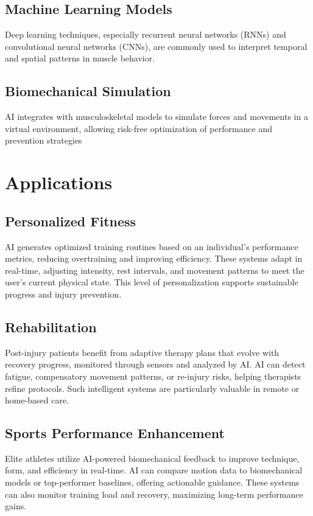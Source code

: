 \documentclass[a4paper,10pt,twocolumn]{memoir}
\begin{document}
\subsection{Machine Learning Models}
Deep learning techniques, especially recurrent neural networks (RNNs) and convolutional neural networks (CNNs), are commonly used to interpret temporal and spatial patterns in muscle behavior.

\subsection{Biomechanical Simulation}
AI integrates with musculoskeletal models to simulate forces and movements in a virtual environment, allowing risk-free optimization of performance and prevention strategies 


\section*{Applications}

\subsection{Personalized Fitness}
AI generates optimized training routines based on an individual's performance metrics, reducing overtraining and improving efficiency. These systems adapt in real-time, adjusting intensity, rest intervals, and movement patterns to meet the user's current physical state. This level of personalization supports sustainable progress and injury prevention.

\subsection{Rehabilitation}
Post-injury patients benefit from adaptive therapy plans that evolve with recovery progress, monitored through sensors and analyzed by AI. AI can detect fatigue, compensatory movement patterns, or re-injury risks, helping therapists refine protocols. Such intelligent systems are particularly valuable in remote or home-based care.

\subsection{Sports Performance Enhancement}
Elite athletes utilize AI-powered biomechanical feedback to improve technique, form, and efficiency in real-time. AI can compare motion data to biomechanical models or top-performer baselines, offering actionable guidance. These systems can also monitor training load and recovery, maximizing long-term performance gains.
\end{document}
